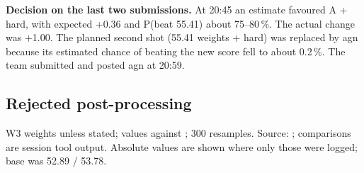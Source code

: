 \textbf{Decision on the last two submissions.} At 20:45 an estimate favoured A + hard, with expected +0.36 and P(beat 55.41) about 75--80\,\%\sn{}. The actual change was +1.00. The planned second shot (55.41 weights + hard) was replaced by agn because its estimated chance of beating the new score fell to about 0.2\,\%\sn{}. The team submitted and posted agn at 20:59.

\subsection{Rejected post-processing}
\label{sec:rejected}

W3 weights unless stated; values against ; 300 resamples. Source: ; comparisons are session tool output. Absolute values are shown where only those were logged; base was 52.89 / 53.78.

